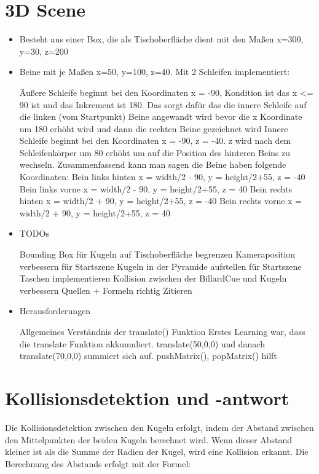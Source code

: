 \documentclass[11pt,a4paper]{article}
\begin{document}
\section{3D Scene }
\begin{itemize}
	\item Besteht aus einer Box, die als Tischoberfläche dient mit den Maßen x=300, y=30, z=200
	\item Beine mit je Maßen x=50, y=100, z=40. Mit 2 Schleifen implementiert:
	\begin{outline}
	\1 Äußere Schleife beginnt bei den Koordinaten x = -90, Kondition ist das x <= 90 ist und das Inkrement ist 180. Das sorgt dafür das die innere Schleife auf die linken (vom Startpunkt) Beine angewandt wird bevor die x Koordinate um 180 erhöht wird und dann die rechten Beine gezeichnet wird
	\1 Innere Schleife beginnt bei den Koordinaten x = -90, z = -40. z wird nach dem Schleifenkörper um 80 erhöht um auf die Position des hinteren Beins zu wechseln.
	\1 Zusammenfassend kann man sagen die Beine haben folgende Koordinaten:
	\2 Bein links hinten x = width/2 - 90, y = height/2+55, z = -40
	\2 Bein links vorne x = width/2 - 90, y = height/2+55, z = 40
	\2 Bein rechts hinten x = width/2 + 90, y = height/2+55, z = -40
	\2 Bein rechts vorne x = width/2 + 90, y = height/2+55, z = 40
	\end{outline}
	\item TODOs
	\begin{outline}
		\1 Bounding Box für Kugeln auf Tischoberfläche begrenzen
		\1 Kameraposition verbessern für Startszene
		\1 Kugeln in der Pyramide aufstellen für Startszene
		\1 Taschen implementieren
		\1 Kollision zwischen der BillardCue und Kugeln verbessern
		\1 Quellen + Formeln richtig Zitieren
	\end{outline}
	\item Herausforderungen
	\begin{outline}
		\1 Allgemeines Verständnis der translate() Funktion
		\2 Erstes Learning war, dass die translate Funktion akkumuliert. translate(50,0,0) und danach translate(70,0,0) summiert sich auf. pushMatrix(), popMatrix() hilft
	\end{outline}
	\end{itemize}
	\newpage
	\section{Kollisionsdetektion und -antwort}

Die Kollisionsdetektion zwischen den Kugeln erfolgt, indem der Abstand zwischen den Mittelpunkten der beiden Kugeln berechnet wird. Wenn dieser Abstand kleiner ist als die Summe der Radien der Kugel, wird eine Kollision erkannt. Die Berechnung des Abstands erfolgt mit der Formel:
\end{document}
